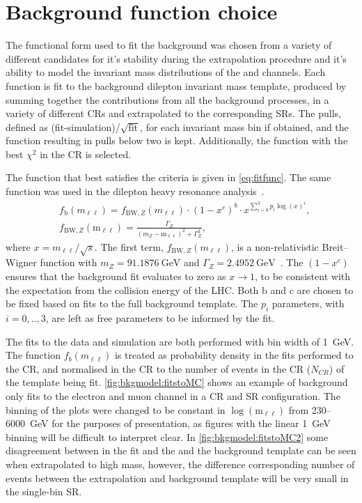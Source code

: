 \section{Background function choice}\label{sec:modelchoice}
The functional form used to fit the background was chosen from a variety of different candidates for it's stability during the extrapolation procedure and it's ability to model the invariant mass distributions of the \ee and \mumu channels. Each function is fit to the background dilepton invariant mass template, produced by summing together the contributions from all the background processes, in a variety of different CRs and extrapolated to the corresponding SRs. The pulls, defined as (fit-simulation)/$\sqrt{\mathrm{fit}}$, for each invariant mass bin if obtained, and the function resulting in pulls below two is kept. Additionally, the function with the best $\chi^2$ in the CR is selected.

The function that best satisfies the criteria is given in \cref{eq:fitfunc}. The same function was used in the dilepton heavy resonance analysis~\cite{Aad:2019fac}.
\begin{equation}
    \label{eq:fitfunc}
    \begin{aligned}
        & f_\textrm{b}(m_{\ell\ell}) = f_{\mathrm{BW},Z}(m_{\ell\ell}) \cdot \left(1 - x^{c}\right)^{b} \cdot x^{\sum_{i=0}^3 p_i\log(x)^i}, \\
        & f_{\mathrm{BW},Z}(\mathrm{m_{\ell\ell}}) = \frac{\Gamma_Z}{(m_Z - \mathrm{m_{\ell\ell}})^2 + \Gamma_Z^2},
    \end{aligned}
\end{equation}
where $x = m_{\ell\ell}/\sqrt{s}$. The first term, $f_{\mathrm{BW},Z}(m_{\ell\ell})$, is a non-relativistic Breit--Wigner function with $m_Z = \SI{91.1876}{\giga\electronvolt}$ and $\Gamma_Z = \SI{2.4952}{\giga\electronvolt}$~\cite{PhysRevD.98.030001}. The $(1 - x^{c})$ ensures that the background fit evaluates to zero as $x \to 1$, to be consistent with the expectation from the collision energy of the LHC. Both b and c are chosen to be fixed based on fits to the full background template. The $p_i$ parameters, with $i = 0,..,3$, are left as free parameters to be informed by the fit. 

The fits to the data and simulation are both performed with bin width of \SI{1}{\giga\electronvolt}. The function $f_b(m_{\ell\ell})$ is treated as probability density in the fits performed to the CR, and normalised in the CR to the number of events in the CR ($N_{CR}$) of the template being fit. \cref{fig:bkgmodel:fitstoMC} shows an example of background only fits to the electron and muon channel in a CR and SR configuration. The binning of the plots were changed to be constant in $\log{(\text{m}_{\ell\ell})}$ from 230--\SI{6000}{\giga\electronvolt} for the purposes of presentation, as figures with the linear \SI{1}{\giga\electronvolt} binning will be difficult to interpret clear. In \cref{fig:bkgmodel:fitstoMC2} some disagreement between in the fit and the and the background template can be seen when extrapolated to high mass, however, the difference  corresponding number of events between the extrapolation and background template will be very small in the single-bin SR. 

